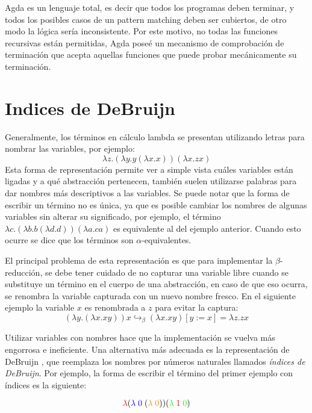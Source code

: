 Agda es un lenguaje total, es decir que todos los programas deben terminar, y todos los posibles casos de un pattern matching deben ser cubiertos, de otro modo la lógica sería inconsistente.
Por este motivo, no todas las funciones recursivas están permitidas, Agda poseé un mecanismo de comprobación de terminación que acepta aquellas funciones que puede probar mecánicamente su terminación.


\section{Indices de DeBruijn}
Generalmente, los términos en cálculo lambda se presentan utilizando letras para nombrar las variables, por ejemplo:
\[ \lambda z. (\lambda y. y (\lambda x. x)) (\lambda x. z x) \]
Esta forma de representación permite ver a simple vista cuáles variables están ligadas y a qué abstracción pertenecen, también suelen utilizarse palabras para dar nombres más descriptivos a las variables.
Se puede notar que la forma de escribir un término no es única, ya que es posible cambiar los nombres de algunas variables sin alterar su significado, por ejemplo, el término $\lambda c. (\lambda b. b (\lambda d. d)) (\lambda a. c a)$ es equivalente al del ejemplo anterior.
Cuando esto ocurre se dice que los términos son $\alpha$-equivalentes.

El principal problema de esta representación es que para implementar la $\beta$-reducción, se debe tener cuidado de no capturar una variable libre cuando se substituye un término en el cuerpo de una abstracción, en caso de que eso ocurra, se renombra la variable capturada con un nuevo nombre fresco.
En el siguiente ejemplo la variable $x$ es renombrada a $z$ para evitar la captura:
\[ (\lambda y. (\lambda x. x y)) x \hookrightarrow_{\beta} (\lambda x. x y)[y := x] = \lambda z. z x \]

Utilizar variables con nombres hace que la implementación se vuelva más engorrosa e ineficiente.
Una alternativa más adecuada es la representación de DeBruijn \cite{debrujin_index}, que reemplaza los nombres por números naturales llamados \textit{índices de DeBruijn}.
Por ejemplo, la forma de escribir el término del primer ejemplo con índices es la siguiente:

\[ \textcolor{red}{\lambda} (\textcolor{blue}{\lambda\; 0} \; (\textcolor{orange}{\lambda\; 0})) (\textcolor{green}{\lambda}\; \textcolor{red}{1} \; \textcolor{green}{0}) \]

